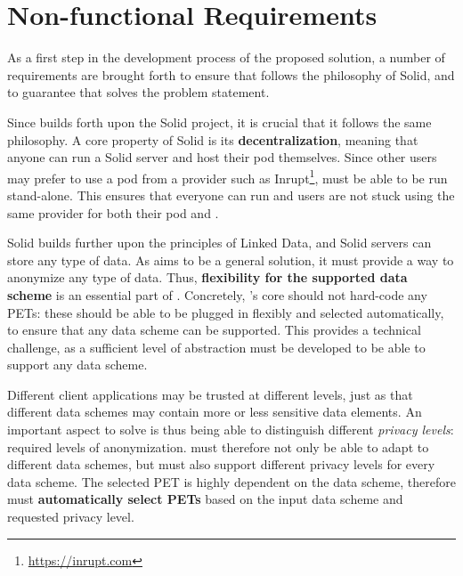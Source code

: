 \section{Non-functional Requirements}

As a first step in the development process of the proposed solution, a number of requirements are brought forth to ensure that \middleware{} follows the philosophy of Solid, and to guarantee that solves the problem statement.

Since \middleware{} builds forth upon the Solid project, it is crucial that it follows the same philosophy. A core property of Solid is its \textbf{decentralization}, meaning that anyone can run a Solid server and host their pod themselves. Since other users may prefer to use a pod from a provider such as Inrupt\footnote{\url{https://inrupt.com}}, \middleware{} must be able to be run stand-alone. This ensures that 
everyone can run \middleware{} and users are not stuck using the same provider for both their pod and \middleware{}.

Solid builds further upon the principles of Linked Data, and Solid servers can store any type of data. As \middleware{} aims to be a general solution, it must provide a way to anonymize any type of data. Thus, \textbf{flexibility for the supported data scheme} is an essential part of \middleware{}. Concretely, \middleware{}'s core should not hard-code any \gls{PETs}: these should be able to be plugged in flexibly and selected automatically, to ensure that any data scheme can be supported. This provides a technical challenge, as a sufficient level of abstraction must be developed to be able to support any data scheme.

Different client applications may be trusted at different levels, just as that different data schemes may contain more or less sensitive data elements. An important aspect to solve is thus being able to distinguish different \textit{privacy levels}: required levels of anonymization. \middleware{} must therefore not only be able to adapt to different data schemes, but must also support different privacy levels for every data scheme. The selected PET is highly dependent on the data scheme, therefore \middleware{} must \textbf{automatically select \gls{PETs}} based on the input data scheme and requested privacy level.

